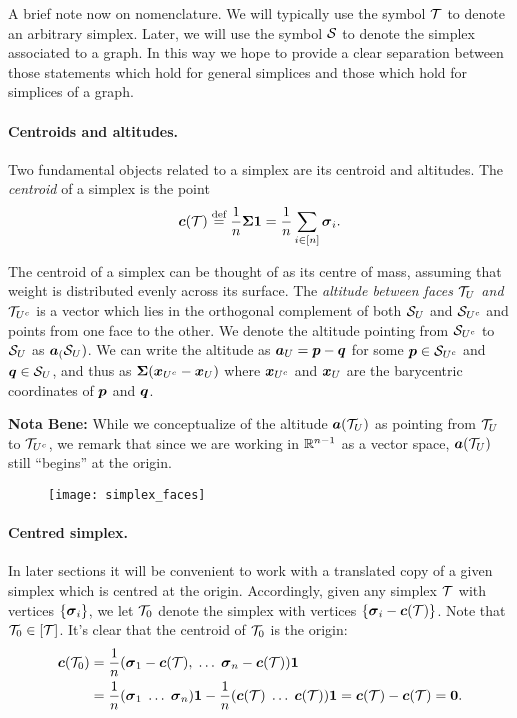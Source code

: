 A brief note now on nomenclature. We will typically  use the symbol $\mathcal{T}$ to denote an arbitrary simplex. Later, we will use the symbol $\mathcal{S}$  to denote  the simplex associated  to a  graph. In  this way we hope to provide a clear separation between those statements which hold for general simplices and those which hold for simplices of a graph. 


\paragraph{Centroids and altitudes.}
Two fundamental objects related to a simplex are its centroid and altitudes. The \emph{centroid} of a simplex is the point 
\begin{equation}
\label{eq:centroid}
\vb*{c}(\mathcal{T}) \overset{\text{def}}{=} \frac{1}{n}\boldsymbol{\Sigma} \vb{1} = \frac{1}{n}\sum_{i\in[n]}\vb*{\sigma}_i.
\end{equation} 

The centroid of a simplex can be thought of as its centre of mass, assuming that weight is distributed evenly across its surface. The \emph{altitude between faces $\mathcal{T}_U$ and $\mathcal{T}_{U^c}$} is a vector which lies in the orthogonal complement of both $\mathcal{S}_U$ and $\mathcal{S}_{U^c}$ and points from one face to the other. 
We denote the altitude pointing from $\mathcal{S}_{U^c}$ to $\mathcal{S}_{U}$ as $\vb*{a}_(\mathcal{S}_U)$. We can write the altitude as $\vb*{a}_U=\vb*{p}-\vb*{q}$ for some $\vb*{p}\in \mathcal{S}_{U^c}$ and $\vb*{q}\in\mathcal{S}_{U}$, and thus as $\boldsymbol{\Sigma}(\vb*{x}_{U^c}-\vb*{x}_{U})$ where $\vb*{x}_{U^c}$ and $\vb*{x}_{U}$ are the barycentric coordinates of $\vb*{p}$ and $\vb*{q}$. 

\textbf{Nota Bene:} While  we conceptualize of the altitude $\vb*{a}(\mathcal{T}_U)$ as pointing from $\mathcal{T}_U$  to  $\mathcal{T}_{U^c}$, we  remark that since we are working in  $\mathbb{R}^{n-1}$  as  a vector  space,  $\vb*{a}(\mathcal{T}_U)$ still ``begins'' at  the origin. 

\begin{figure}
	\centering
	\texttt{[image: simplex\_faces]}
	\caption{}
	\label{fig:simplex_faces}
\end{figure}

\paragraph{Centred  simplex.}
In later sections it will be convenient to work with a translated copy of a given simplex which is centred at the origin. Accordingly, given any simplex $\mathcal{T}$ with vertices $\{\vb*{\sigma}_i\}$, we let $\mathcal{T}_0$ denote the simplex with vertices $\{\vb*{\sigma}_i - \vb*{c}(\mathcal{T})\}$. Note that $\mathcal{T}_0\in[\mathcal{T}]$. It's clear that the centroid of $\mathcal{T}_0$ is the origin: 
\begin{align*}
\vb*{c}(\mathcal{T}_0) 
&= \frac{1}{n}(\vb*{\sigma}_1-\vb*{c}(\mathcal{T}),\;\dots\;\vb*{\sigma}_n-\vb*{c}(\mathcal{T}))\vb{1} \\
&= \frac{1}{n}(\vb*{\sigma}_1\;\dots\;\vb*{\sigma}_n)\vb{1} - \frac{1}{n}(\vb*{c}(\mathcal{T})\;\dots\;\vb*{c}(\mathcal{T}))\vb{1} = \vb*{c}(\mathcal{T}) - \vb*{c}(\mathcal{T})=\vb{0}.
\end{align*}

